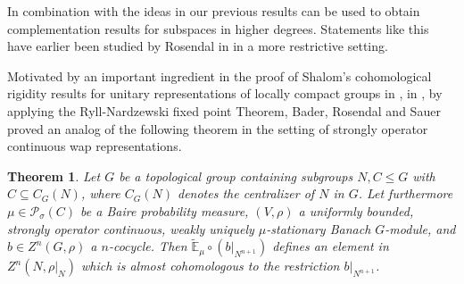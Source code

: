 \documentclass[a4paper,11pt,reqno]{amsart}
\numberwithin{equation}{section}
\newtheorem{theorem}{Theorem}[section]
\theoremstyle{definition}
\theoremstyle{remark}
\theoremstyle{remark}
\begin{document}
In combination with the ideas in \cite{BaderRosendalSauer} our previous results can be used to obtain complementation results for subspaces in higher degrees. Statements like this have earlier been studied by Rosendal in \cite{Rosendal22} in a more restrictive setting.

Motivated by an important ingredient in the proof of Shalom's cohomological rigidity results for unitary representations of locally compact groups in \cite{Shalom00}, in \cite{BaderRosendalSauer}, by applying the Ryll-Nardzewski fixed point Theorem, Bader, Rosendal and Sauer proved an analog of the following theorem in the setting of strongly operator continuous wap representations.

\begin{theorem} \label{MainTheorem} Let $G$ be a topological group containing subgroups $N,C\leq G$ with $C\subseteq C_{G}(N)$, where $C_{G}(N)$ denotes the \emph{centralizer} of $N$ in $G$. Let furthermore $\mu\in\mathcal{P}_{\sigma}(C)$ be a Baire probability measure, $(V,\rho)$ a uniformly bounded, strongly operator continuous, weakly uniquely $\mu$-stationary Banach $G$-module, and $b\in Z^{n}(G,\rho)$ a $n$-cocycle. Then $\widetilde{\mathbb{E}}_{\mu}\circ(b|_{N^{n+1}})$ defines an element in $Z^{n}(N,\rho|_{N})$ which is almost cohomologous to the restriction $b|_{N^{n+1}}$. \end{theorem}
\end{document}
